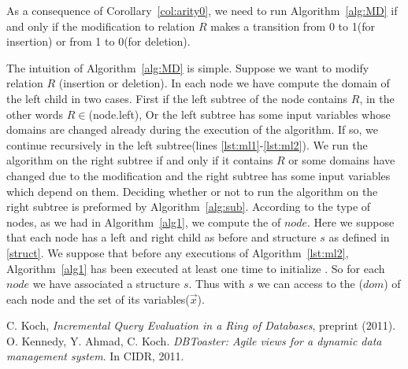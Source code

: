 \documentclass[12pt]{article}
\begin{document}
 As a consequence of Corollary~\ref{col:arity0}, we need to run Algorithm~\ref{alg:MD} if and only if the modification to relation $R$ makes a transition from 0 to 1(for insertion) or from 1 to 0(for deletion). \par 
 The intuition of Algorithm~\ref{alg:MD} is simple. Suppose we want to modify relation $R$ (insertion or deletion).
In each node we have compute the domain of the left child in two cases. First if the left subtree of the node contains $R$, in the other words $R\in$\Rel(node.left), Or the left subtree has some input variables whose domains are changed already during the execution of the algorithm. If so, we continue recursively in the left subtree(lines \ref{lst:ml1}-\ref{lst:ml2}). We run the algorithm on the right subtree if and only if it contains $R$ or some domains have changed due to the modification and the right subtree has some input variables which depend on them. Deciding whether or not to run the algorithm on the right subtree is preformed by Algorithm~\ref{alg:sub}.
According to the type of nodes, as we had in Algorithm~\ref{alg1}, we compute the \dom{} of $node$. Here we suppose that each node has a left and right child as before and structure $s$ as defined in \ref{struct}. We suppose that before any executions of Algorithm~\ref{lst:ml2}, Algorithm~\ref{alg1} has been executed at least one time to initialize . So for each $node$ we have associated a structure $s$. Thus with $s$ we can access to the \dom($dom$) of each node and the set of its variables($\vec{x}$). 

\begin{thebibliography}{9}
 C. Koch, \emph{Incremental Query Evaluation in a Ring of Databases},  preprint (2011).
 O. Kennedy, Y. Ahmad, C. Koch. \emph{DBToaster: Agile views for a dynamic data management system}. In CIDR, 2011.
\end{thebibliography}
\end{document}

